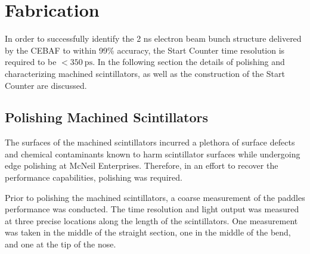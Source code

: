 \section{Fabrication} \label{sec:fab}

In order to successfully identify the 2 ns electron beam bunch structure delivered by the CEBAF to within 99\% accuracy, the \gx{} Start Counter time resolution is required to be $<350\ \mathrm{ps}$.  In the following section the details of polishing and characterizing machined scintillators, as well as the construction of the Start Counter are discussed.

\subsection{Polishing Machined Scintillators} \label{sec:fab_polish}

The surfaces of the machined scintillators incurred a plethora of surface defects and chemical contaminants known to harm scintillator surfaces while undergoing edge polishing at McNeil Enterprises.  Therefore, in an effort to recover the performance capabilities, polishing was required.

Prior to polishing the machined scintillators, a coarse measurement of the paddles performance was conducted.
The time resolution and light output was measured at three precise locations along the length of the scintillators. One measurement was taken in the middle of the straight section, one in the middle of the bend, and one at the tip of the nose. 


